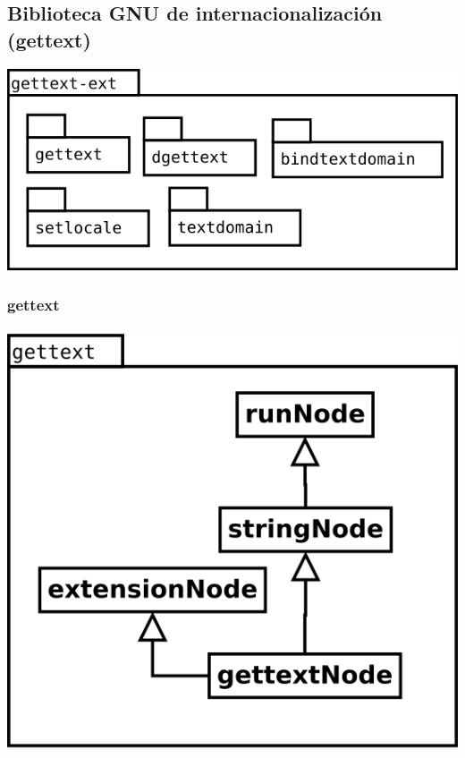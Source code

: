 \subsection{Biblioteca GNU de internacionalización (gettext)}
\begin{center}
\includegraphics[scale=0.4]{gettext-ext-package.png} \\
\end{center}
\subsubsection {gettext}
\begin{center}
\includegraphics[scale=0.4]{gettext.png} \\
\end{center}

